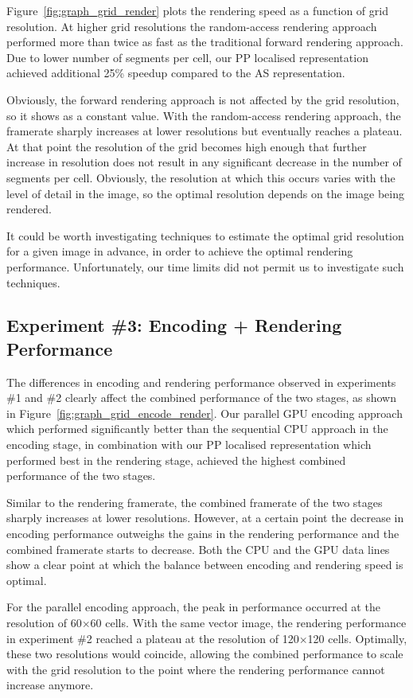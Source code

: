 \documentclass[11pt,a4paper,twoside]{article}
\begin{document}
Figure~\ref{fig:graph_grid_render} plots the rendering speed as a function of grid resolution. At higher grid resolutions the random-access rendering approach performed more than twice as fast as the traditional forward rendering approach. Due to lower number of segments per cell, our PP localised representation achieved additional 25\% speedup compared to the AS representation.

Obviously, the forward rendering approach is not affected by the grid resolution, so it shows as a constant value. With the random-access rendering approach, the framerate sharply increases at lower resolutions but eventually reaches a plateau. At that point the resolution of the grid becomes high enough that further increase in resolution does not result in any significant decrease in the number of segments per cell. Obviously, the resolution at which this occurs varies with the level of detail in the image, so the optimal resolution depends on the image being rendered.

It could be worth investigating techniques to estimate the optimal grid resolution for a given image in advance, in order to achieve the optimal rendering performance. Unfortunately, our time limits did not permit us to investigate such techniques.

\subsection {Experiment \#3: Encoding + Rendering Performance}

The differences in encoding and rendering performance observed in experiments \#1  and \#2 clearly affect the combined performance of the two stages, as shown in Figure~\ref{fig:graph_grid_encode_render}. Our parallel GPU encoding approach which performed significantly better than the sequential CPU approach in the encoding stage, in combination with our PP localised representation which performed best in the rendering stage, achieved the highest combined performance of the two stages.

Similar to the rendering framerate, the combined framerate of the two stages sharply increases at lower resolutions. However, at a certain point the decrease in encoding performance outweighs the gains in the rendering performance and the combined framerate starts to decrease. Both the CPU and the GPU data lines show a clear point at which the balance between encoding and rendering speed is optimal.

For the parallel encoding approach, the peak in performance occurred at the resolution of 60$\times$60 cells. With the same vector image, the rendering performance in experiment \#2 reached a plateau at the resolution of 120$\times$120 cells. Optimally, these two resolutions would coincide, allowing the combined performance to scale with the grid resolution to the point where the rendering performance cannot increase anymore.
\end{document}
